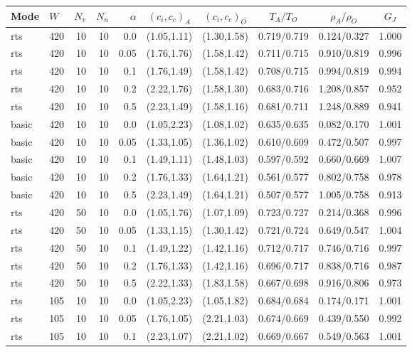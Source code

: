 \begin{tabular}{llrrrccccc}
\hline
Mode & $W$ & $N_v$ & $N_n$ & $\alpha$ & $(c_i,c_c)_A$ & $(c_i,c_c)_O$ & $T_A/T_O$ & $\rho_A/\rho_O$ & $G_J$ \\
\hline
rts & 420 & 10 & 10 & 0.0 & (1.05,1.11) & (1.30,1.58) & 0.719/0.719 & 0.124/0.327 & 1.000 \\
rts & 420 & 10 & 10 & 0.05 & (1.76,1.76) & (1.58,1.42) & 0.711/0.715 & 0.910/0.819 & 0.996 \\
rts & 420 & 10 & 10 & 0.1 & (1.76,1.49) & (1.58,1.42) & 0.708/0.715 & 0.994/0.819 & 0.994 \\
rts & 420 & 10 & 10 & 0.2 & (2.22,1.76) & (1.58,1.30) & 0.683/0.716 & 1.208/0.857 & 0.952 \\
rts & 420 & 10 & 10 & 0.5 & (2.23,1.49) & (1.58,1.16) & 0.681/0.711 & 1.248/0.889 & 0.941 \\
basic & 420 & 10 & 10 & 0.0 & (1.05,2.23) & (1.08,1.02) & 0.635/0.635 & 0.082/0.170 & 1.001 \\
basic & 420 & 10 & 10 & 0.05 & (1.33,1.05) & (1.36,1.02) & 0.610/0.609 & 0.472/0.507 & 0.997 \\
basic & 420 & 10 & 10 & 0.1 & (1.49,1.11) & (1.48,1.03) & 0.597/0.592 & 0.660/0.669 & 1.007 \\
basic & 420 & 10 & 10 & 0.2 & (1.76,1.33) & (1.64,1.21) & 0.561/0.577 & 0.802/0.758 & 0.978 \\
basic & 420 & 10 & 10 & 0.5 & (2.23,1.49) & (1.64,1.21) & 0.507/0.577 & 1.005/0.758 & 0.913 \\
rts & 420 & 50 & 10 & 0.0 & (1.05,1.76) & (1.07,1.09) & 0.723/0.727 & 0.214/0.368 & 0.996 \\
rts & 420 & 50 & 10 & 0.05 & (1.33,1.15) & (1.30,1.42) & 0.721/0.724 & 0.649/0.547 & 1.004 \\
rts & 420 & 50 & 10 & 0.1 & (1.49,1.22) & (1.42,1.16) & 0.712/0.717 & 0.746/0.716 & 0.997 \\
rts & 420 & 50 & 10 & 0.2 & (1.76,1.33) & (1.42,1.16) & 0.696/0.717 & 0.838/0.716 & 0.987 \\
rts & 420 & 50 & 10 & 0.5 & (2.22,1.33) & (1.83,1.58) & 0.667/0.698 & 0.916/0.806 & 0.973 \\
rts & 105 & 10 & 10 & 0.0 & (1.05,2.23) & (1.05,1.82) & 0.684/0.684 & 0.174/0.171 & 1.001 \\
rts & 105 & 10 & 10 & 0.05 & (1.76,1.05) & (2.21,1.03) & 0.674/0.669 & 0.439/0.550 & 0.992 \\
rts & 105 & 10 & 10 & 0.1 & (2.23,1.07) & (2.21,1.02) & 0.669/0.667 & 0.549/0.563 & 1.001 \\

\end{tabular}

